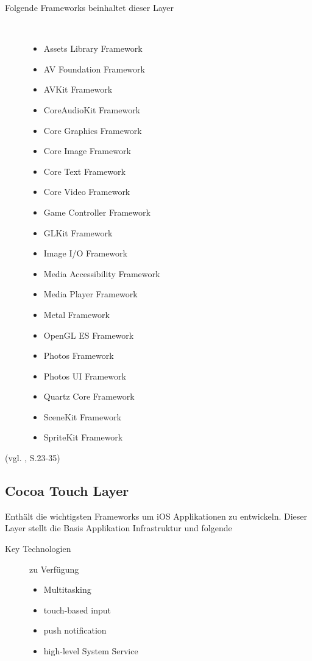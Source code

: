 \begin{description}
	\item[Folgende Frameworks beinhaltet dieser Layer]~\par
	\begin{multicols}{2}
	\begin{itemize}
		\item Assets Library Framework
		\item AV Foundation Framework
		\item AVKit Framework
		\item CoreAudioKit Framework
		\item Core Graphics Framework
		\item Core Image Framework
		\item Core Text Framework
		\item Core Video Framework
		\item Game Controller Framework
		\item GLKit Framework
		\item Image I/O Framework
		\item Media Accessibility Framework
		\item Media Player Framework
		\item Metal Framework
		\item OpenGL ES Framework
		\item Photos Framework
		\item Photos UI Framework
		\item Quartz Core Framework
		\item SceneKit Framework
		\item SpriteKit Framework
         \end{itemize}
	\end{multicols}
\end{description}
(vgl. \cite{Apple[6]}, S.23-35)
\subsection{Cocoa Touch Layer}
\label{sec:CocoaTouchLayer}
Enthält die wichtigsten Frameworks um iOS Applikationen zu entwickeln. Dieser
Layer stellt die Basis Applikation Infrastruktur und folgende
\begin{description}
\item[\glqq Key Technologien\grqq{}]zu Verfügung ~\par  
	\begin{itemize}
		\item Multitasking
		\item touch-based input
		\item push notification
		\item \glqq high-level\grqq{} System Service
	\end{itemize}
\end{description}

